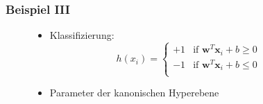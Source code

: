 \begin{frame}
    \frametitle{Beispiel III}

    \begin{figure}[h]
        \begin{minipage}{0.4\textwidth} 
        \end{minipage}
        \hfill
        \begin{minipage}{0.4\textwidth}
            \begin{itemize}
                \item<1-> Klassifizierung:
                    \begin{equation*}
                        h(x_i) = \begin{cases}
                            +1 & \text{if } \boldsymbol{w}^T \boldsymbol{x}_i + b \geq 0 \\
                            -1 & \text{if } \boldsymbol{w}^T \boldsymbol{x}_i + b \leq 0 \\
                        \end{cases}
                    \end{equation*}
                \item<1-> Parameter der kanonischen Hyperebene
                    \begin{align*}

\end{align*}
\end{itemize}
\end{minipage}
\end{figure}
\end{frame}
